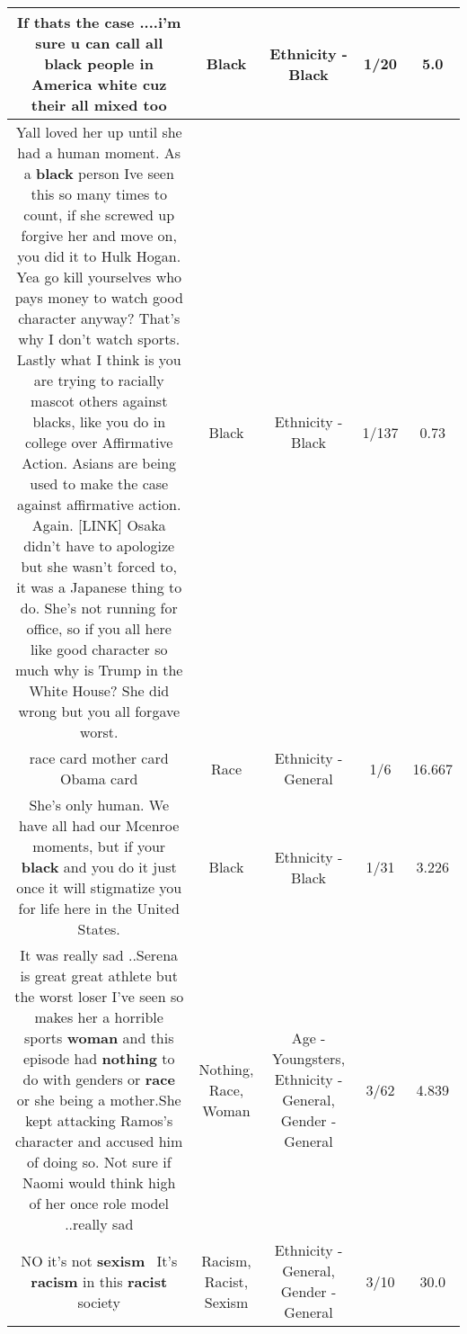\documentclass[11pt]{article}
\newlength\mylength
\begin{document}
\begin{center}
\begin{longtable}{|C{.65\mylength}|C{.30\mylength}|C{.12\mylength}|C{.12\mylength}|C{.12\mylength}|}
  \small If thats the case ....i'm sure u can call all \textbf{black} people in America white cuz their all mixed too\normalsize   & Black & Ethnicity - Black & 1/20 & 5.0 \\  \hline
  \small Yall loved her up until she had a human moment.  As a \textbf{black} person Ive seen this so many times to count, if she screwed up forgive her and move on, you did it to Hulk Hogan.  Yea go kill yourselves who pays money to watch good character anyway?  That's why I don't watch sports.  Lastly what I think is you are trying to racially mascot others against blacks, like you do in college over Affirmative Action. Asians are being used to make the case against affirmative action. Again. [LINK]  Osaka didn't have to apologize but she wasn't forced to, it was a Japanese thing to do.  She's not running for office, so if you all here like good character so much why is Trump in the White House?   She did wrong but you all forgave worst.\normalsize   & Black & Ethnicity - Black & 1/137 & 0.73 \\  \hline
  \small race card mother card Obama card\normalsize   & Race & Ethnicity - General & 1/6 & 16.667 \\  \hline
  \small She's only human.  We have all had our Mcenroe moments, but if your \textbf{black} and you do it just once it will stigmatize you for life here in the United States.\normalsize   & Black & Ethnicity - Black & 1/31 & 3.226 \\  \hline
  \small It was really sad ..Serena is great great athlete but the worst loser I've seen so makes her a horrible sports \textbf{woman} and this episode had \textbf{nothing} to do with genders or \textbf{race} or she being a  mother.She kept attacking Ramos's character and accused him of doing so. Not sure if Naomi would think high of her once role model ..really sad\normalsize   & Nothing, Race, Woman & Age - Youngsters, Ethnicity - General, Gender - General & 3/62 & 4.839 \\  \hline
  \small NO it's not \textbf{sexism}  It's \textbf{racism} in this \textbf{racist} society\normalsize   & Racism, Racist, Sexism & Ethnicity - General, Gender - General & 3/10 & 30.0 \\  \hline

\end{longtable}
\end{center}
\end{document}
